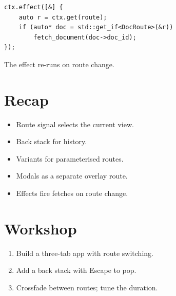 \begin{lstlisting}
ctx.effect([&] {
    auto r = ctx.get(route);
    if (auto* doc = std::get_if<DocRoute>(&r))
        fetch_document(doc->doc_id);
});
\end{lstlisting}

The effect re-runs on route change.

\section{Recap}

\begin{recap}
\begin{itemize}[leftmargin=*]
  \item Route signal selects the current view.
  \item Back stack for history.
  \item Variants for parameterised routes.
  \item Modals as a separate overlay route.
  \item Effects fire fetches on route change.
\end{itemize}
\end{recap}

\section*{Workshop}

\begin{enumerate}[leftmargin=*]
  \item Build a three-tab app with route switching.
  \item Add a back stack with Escape to pop.
  \item Crossfade between routes; tune the duration.
\end{enumerate}
